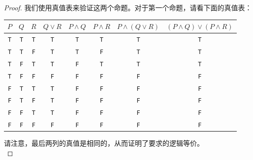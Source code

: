 \begin{proof}
    我们使用真值表来验证这两个命题。对于第一个命题，请看下面的真值表：
    \begin{center}
        \begin{tabular}{c|c|c|c|c|c|c|c}
              $P$ & $Q$ & $R$ & $Q \lor R$ & $P \land Q$  & $P \land R$ & $P \land (Q \lor R)$ & $(P \land Q) \lor (P \land R)$ \\
              \hline
              \verb|T| & \verb|T| & \verb|T| &  \verb|T|  &   \verb|T|   &\verb|T| &\verb|T| &   \verb|T|   \\
              \verb|T| & \verb|T| & \verb|F| &  \verb|T|  &   \verb|T|   &\verb|F| &\verb|T| &   \verb|T|   \\
              \verb|T| & \verb|F| & \verb|T| &  \verb|T|  &   \verb|F|   &\verb|T| &\verb|T| &   \verb|T|   \\
              \verb|T| & \verb|F| & \verb|F| &  \verb|F|  &   \verb|F|   &\verb|F| &\verb|F| &   \verb|F|   \\
              \verb|F| & \verb|T| & \verb|T| &  \verb|T|  &   \verb|F|   &\verb|F| &\verb|F| &   \verb|F|   \\
              \verb|F| & \verb|T| & \verb|F| &  \verb|T|  &   \verb|F|   &\verb|F| &\verb|F| &   \verb|F|   \\
              \verb|F| & \verb|F| & \verb|T| &  \verb|T|  &   \verb|F|   &\verb|F| &\verb|F| &   \verb|F|   \\
              \verb|F| & \verb|F| & \verb|F| &  \verb|F|  &   \verb|F|   &\verb|F| &\verb|F| &   \verb|F|   \\
        \end{tabular}
    \end{center}

    请注意，最后两列的真值是相同的，从而证明了要求的逻辑等价。\\


\end{proof}
